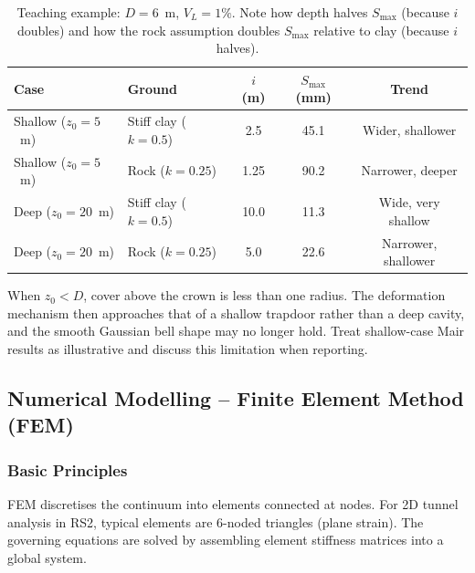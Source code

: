 \documentclass[a4paper,12pt]{article}
\begin{document}
\begin{table}[h!]
\centering
\small
\begin{tabular}{l l c c c}
\toprule
\textbf{Case} & \textbf{Ground} & $i$ (m) & $S_{\text{max}}$ (mm) & \textbf{Trend} \\
\midrule
Shallow ($z_0=5$~m) & Stiff clay ($k=0.5$) & 2.5 & 45.1 & Wider, shallower \\
Shallow ($z_0=5$~m) & Rock ($k=0.25$) & 1.25 & 90.2 & Narrower, deeper \\
Deep ($z_0=20$~m) & Stiff clay ($k=0.5$) & 10.0 & 11.3 & Wide, very shallow \\
Deep ($z_0=20$~m) & Rock ($k=0.25$) & 5.0 & 22.6 & Narrower, shallower \\
\bottomrule
\end{tabular}
\caption{Teaching example: $D = 6$~m, $V_L = 1\%$. Note how depth halves $S_{\text{max}}$ (because $i$ doubles) and how the rock assumption doubles $S_{\text{max}}$ relative to clay (because $i$ halves).}
\label{tab:teaching_example}
\end{table}

\begin{warnbox}
When $z_0 < D$, cover above the crown is less than one radius. The deformation mechanism then approaches that of a shallow trapdoor rather than a deep cavity, and the smooth Gaussian bell shape may no longer hold. Treat shallow-case Mair results as illustrative and discuss this limitation when reporting.
\end{warnbox}

\subsection{Numerical Modelling -- Finite Element Method (FEM)}

\subsubsection{Basic Principles}
FEM discretises the continuum into elements connected at nodes. For 2D tunnel analysis in RS2, typical elements are 6-noded triangles (plane strain). The governing equations are solved by assembling element stiffness matrices into a global system.
\end{document}
